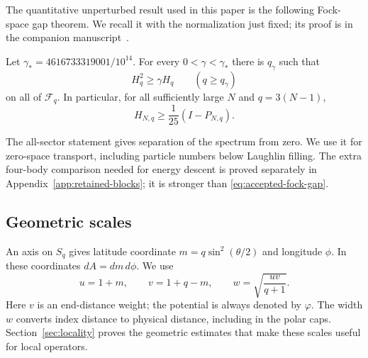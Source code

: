 The quantitative unperturbed result used in this paper is the following
Fock-space gap theorem. We recall it with the normalization just fixed;
its proof is in the companion manuscript~\cite[Theorem~1.1 and
Corollary~1.2]{Gap}.

\begin{theorem}\label{thm:unperturbed}
Let $\gamma_*=4616733319001/10^{14}$. For every
$0<\gamma<\gamma_*$ there is $q_\gamma$ such that
\begin{equation}\label{eq:accepted-fock-gap}
 H_q^2\ge\gamma H_q\qquad(q\ge q_\gamma)
\end{equation}
on all of $\mathcal F_q$. In particular, for all sufficiently large
$N$ and $q=3(N-1)$,
\begin{equation}\label{eq:accepted-filled-gap}
 H_{N,q}\ge\frac1{25}(I-P_{N,q}).
\end{equation}
\end{theorem}

The all-sector statement gives separation of the spectrum from zero.
We use it for zero-space transport, including particle numbers below
Laughlin filling. The extra four-body comparison needed for energy
descent is proved separately in Appendix~\ref{app:retained-blocks}; it
is stronger than \eqref{eq:accepted-fock-gap}.

\subsection{Geometric scales}

An axis on $S_q$ gives latitude coordinate $m=q\sin^2(\theta/2)$
and longitude $\phi$. In these coordinates $dA=dm\,d\phi$.
We use
\begin{equation}\label{eq:geometric-scales}
 u=1+m,\qquad v=1+q-m,\qquad
 w=\sqrt{\frac{uv}{q+1}}.
\end{equation}
Here $v$ is an end-distance weight; the potential is always denoted
by $\varphi$. The width $w$ converts index distance to physical distance,
including in the polar caps. Section~\ref{sec:locality} proves the
geometric estimates that make these scales useful for local operators.
